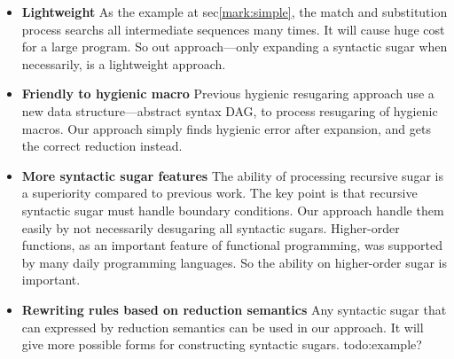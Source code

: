 \begin{itemize}
	\item {\bfseries Lightweight} As the example at sec\ref{mark:simple}, the match and substitution process searchs all intermediate sequences many times. It will cause huge cost for a large program. So out approach---only expanding a syntactic sugar when necessarily, is a lightweight approach.
	\item {\bfseries Friendly to hygienic macro} Previous hygienic resugaring approach use a new data structure---abstract syntax DAG, to process resugaring of hygienic macros. Our approach simply finds hygienic error after expansion, and gets the correct reduction instead. 
	\item {\bfseries More syntactic sugar features} The ability of processing recursive sugar is a superiority compared to previous work. The key point is that recursive syntactic sugar must handle boundary conditions. Our approach handle them easily by not necessarily desugaring all syntactic sugars. Higher-order functions, as an important feature of functional programming, was supported by many daily programming languages. So the ability on higher-order sugar is important. 
	\item {\bfseries Rewriting rules based on reduction semantics} Any syntactic sugar that can expressed by reduction semantics can be used in our approach. It will give more possible forms for constructing syntactic sugars. todo:example?
\end{itemize}
